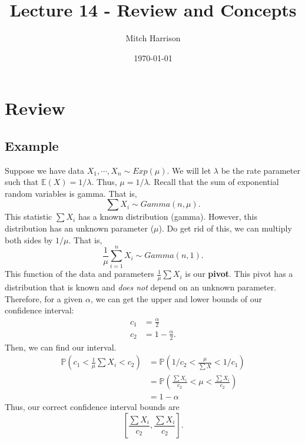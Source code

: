\documentclass[titlepage, 12pt, leqno]{article}
\title{\Huge{Lecture 14 - Review and Concepts}}
\author{\large{Mitch Harrison}}
\date{\today}
\begin{document}
\setlength{\parskip}{1\baselineskip}
\setlength{\parindent}{15pt}
\maketitle
\tableofcontents
\newpage


\section{Review}

\subsection{Example}
Suppose we have data $X_{1}, \cdots , X_{n} \sim Exp(\mu)$. We will let
$\lambda$ be the rate parameter such that $\mathbb{E}(X) = 1/\lambda$. Thus,
$\mu = 1/\lambda$. Recall that the sum of exponential random variables is
gamma. That is,
\[
\sum X_{i} \sim Gamma(n, \mu).
\]
This statistic $\sum X_{i}$ has a known distribution (gamma). However, this
distribution has an unknown parameter ($\mu$). Do get rid of this, we can
multiply both sides by $1/\mu$. That is,
\[
    \frac{1}{\mu}\sum_{i=1}^{n}X_{i} \sim Gamma(n,1).
\]
This function of the data and parameters $\frac{1}{\mu}\sum X_{i}$ is our
\textbf{pivot}. This pivot has a distribution that is known and \textit{does
not} depend on an unknown parameter. Therefore, for a given $\alpha$, we can
get the upper and lower bounds of our confidence interval:
\begin{align*}
    c_{1} &= \frac{\alpha}{2} \\
    c_{2} &= 1 - \frac{\alpha}{2}.
\end{align*}
Then, we can find our interval.
\begin{align*}
    \mathbb{P}(c_{1} < \frac{1}{\mu}\sum X_{i} < c_{2})
    &= \mathbb{P}(1/c_{2} < \frac{\mu}{\sum X} < 1/c_{1}) \\
    &= \mathbb{P}(\frac{\sum X_{i}}{c_{2}}< \mu < \frac{\sum X_{i}}{c_{2}}) \\
    &= 1 - \alpha
\end{align*}
Thus, our correct confidence interval bounds are
\[
    \boxed{\left[ \frac{\sum X_{i}}{c_{2}}, \frac{\sum X_{i}}{c_{2}} \right]}.
\]
\end{document}
